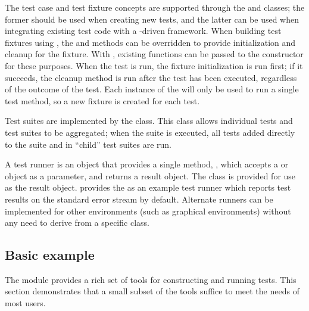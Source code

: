 The test case and test fixture concepts are supported through the
 and  classes; the former
should be used when creating new tests, and the latter can be used when
integrating existing test code with a -driven framework.
When building test fixtures using , the 
and  methods can be overridden to provide
initialization and cleanup for the fixture.  With
, existing functions can be passed to the
constructor for these purposes.  When the test is run, the
fixture initialization is run first; if it succeeds, the cleanup
method is run after the test has been executed, regardless of the
outcome of the test.  Each instance of the  will only
be used to run a single test method, so a new fixture is created for
each test.

Test suites are implemented by the  class.  This
class allows individual tests and test suites to be aggregated; when
the suite is executed, all tests added directly to the suite and in
``child'' test suites are run.

A test runner is an object that provides a single method,
, which accepts a  or 
object as a parameter, and returns a result object.  The class
 is provided for use as the result object.
 provides the  as an example
test runner which reports test results on the standard error stream by
default.  Alternate runners can be implemented for other environments
(such as graphical environments) without any need to derive from a
specific class.


\begin{seealso}
\end{seealso}


\subsection{Basic example \label{minimal-example}}

The  module provides a rich set of tools for
constructing and running tests.  This section demonstrates that a
small subset of the tools suffice to meet the needs of most users.

